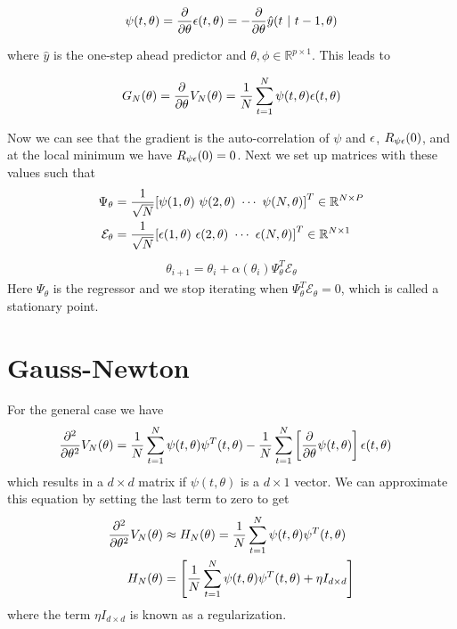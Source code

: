 \begin{equation*}
\psi(t,\theta) = \frac{\partial}{\partial\theta}\epsilon(t,\theta) = -\frac{\partial}{\partial\theta}\hat{y}(t~|~t-1,\theta)
\end{equation*}

where $\hat{y}$ is the one-step ahead predictor and $\theta,\phi\in\mathbb{R}^{p\times1}$.
This leads to

\begin{equation*}
G_N(\theta) = \frac{\partial}{\partial\theta}V_N(\theta) = \frac{1}{N}\sum_{t=1}^N\psi(t,\theta)\epsilon(t,\theta)
\end{equation*}

Now we can see that the gradient is the auto-correlation of $\psi$ and $\epsilon$, $R_{\psi\epsilon}(0)$, and at the local minimum we have $R_{\psi\epsilon}(0)=0$.
Next we set up matrices with these values such that
\begin{align*}
\Psi_\theta &= \frac{1}{\sqrt{N}} {[\psi(1,\theta)~\psi(2,\theta)~\cdots~\psi(N,\theta)]}^T\in\mathbb{R}^{N\times P} \\
\mathcal{E}_\theta &= \frac{1}{\sqrt{N}} {[\epsilon(1,\theta)~\epsilon(2,\theta)~\cdots~\epsilon(N,\theta)]}^T\in\mathbb{R}^{N\times1}
\end{align*}
\begin{align*}
\boxed{\theta_{i+1} = \theta_i + \alpha(\theta_i)\Psi_\theta^T\mathcal{E}_\theta}
\end{align*}
Here $\Psi_\theta$ is the regressor and we stop iterating when $\Psi_\theta^T\mathcal{E}_\theta=0$, which is called a stationary point.

\section{Gauss-Newton}
For the general case we have
\begin{align*}
\frac{\partial^2}{\partial\theta^2}V_N(\theta) &= \frac{1}{N}\sum_{t=1}^N\psi(t,\theta)\psi^T(t,\theta) - \frac{1}{N}\sum_{t=1}^N\left[\frac{\partial}{\partial\theta}\psi(t,\theta)\right]\epsilon(t,\theta)
\end{align*}
which results in a $d\times d$ matrix if $\psi(t,\theta)$ is a $d\times1$ vector.
We can approximate this equation by setting the last term to zero to get
\begin{align}
\label{eq:18hn}
\frac{\partial^2}{\partial\theta^2}V_N(\theta) &\approx H_N(\theta) = \frac{1}{N}\sum_{t=1}^N\psi(t,\theta)\psi^T(t,\theta) \\
\label{eq:18hnalt}
H_N(\theta) &= \left[\frac{1}{N}\sum_{t=1}^N\psi(t,\theta)\psi^T(t,\theta) + \eta I_{d\times d}\right]
\end{align}
where the term $\eta I_{d\times d}$ is known as a regularization.

